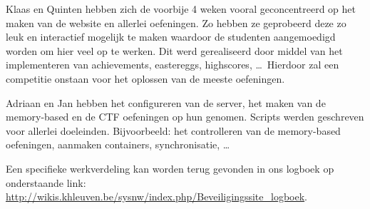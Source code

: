 Klaas en Quinten hebben zich de voorbije 4 weken vooral geconcentreerd op het maken van de website en allerlei oefeningen. Zo hebben ze geprobeerd deze zo leuk en interactief mogelijk te maken waardoor de studenten aangemoedigd worden om hier veel op te werken. Dit werd gerealiseerd door middel van het implementeren van achievements, eastereggs, highscores, \ldots ~Hierdoor zal een competitie onstaan voor het oplossen van de meeste oefeningen.

Adriaan en Jan hebben het configureren van de server, het maken van de memory-based\cite{taoe} en de CTF oefeningen op hun genomen. Scripts werden geschreven voor allerlei doeleinden. Bijvoorbeeld: het controlleren van de memory-based oefeningen, aanmaken containers, synchronisatie, \ldots

Een specifieke werkverdeling kan worden terug gevonden in ons logboek op onderstaande link:
\url{http://wikis.khleuven.be/sysnw/index.php/Beveiligingssite_logboek}.